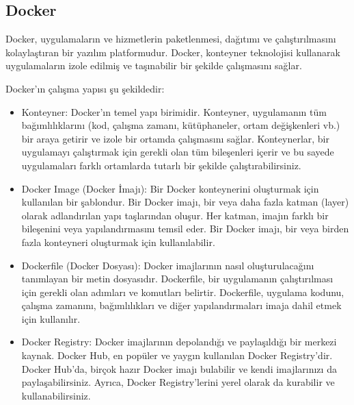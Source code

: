 \subsection{Docker }

Docker, uygulamaların ve hizmetlerin paketlenmesi, dağıtımı ve çalıştırılmasını kolaylaştıran bir yazılım platformudur. Docker, konteyner teknolojisi kullanarak uygulamaların izole edilmiş ve taşınabilir bir şekilde çalışmasını sağlar.

Docker'ın çalışma yapısı şu şekildedir:
\begin{itemize}
\item Konteyner: Docker'ın temel yapı birimidir. Konteyner, uygulamanın tüm bağımlılıklarını (kod, çalışma zamanı, kütüphaneler, ortam değişkenleri vb.) bir araya getirir ve izole bir ortamda çalışmasını sağlar. Konteynerlar, bir uygulamayı çalıştırmak için gerekli olan tüm bileşenleri içerir ve bu sayede uygulamaları farklı ortamlarda tutarlı bir şekilde çalıştırabilirsiniz.

\item Docker Image (Docker İmajı): Bir Docker konteynerini oluşturmak için kullanılan bir şablondur. Bir Docker imajı, bir veya daha fazla katman (layer) olarak adlandırılan yapı taşlarından oluşur. Her katman, imajın farklı bir bileşenini veya yapılandırmasını temsil eder. Bir Docker imajı, bir veya birden fazla konteyneri oluşturmak için kullanılabilir.

\item Dockerfile (Docker Dosyası): Docker imajlarının nasıl oluşturulacağını tanımlayan bir metin dosyasıdır. Dockerfile, bir uygulamanın çalıştırılması için gerekli olan adımları ve komutları belirtir. Dockerfile, uygulama kodunu, çalışma zamanını, bağımlılıkları ve diğer yapılandırmaları imaja dahil etmek için kullanılır.

\item Docker Registry: Docker imajlarının depolandığı ve paylaşıldığı bir merkezi kaynak. Docker Hub, en popüler ve yaygın kullanılan Docker Registry'dir. Docker Hub'da, birçok hazır Docker imajı bulabilir ve kendi imajlarınızı da paylaşabilirsiniz. Ayrıca, Docker Registry'lerini yerel olarak da kurabilir ve kullanabilirsiniz.
\end{itemize}

